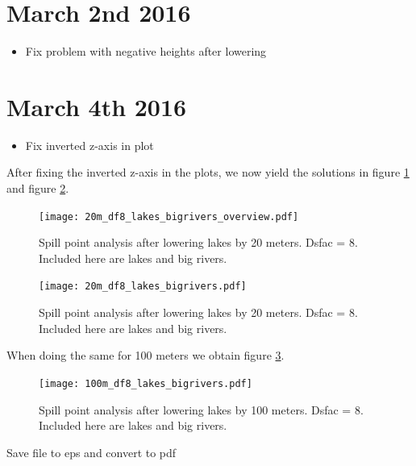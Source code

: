 \documentclass[10pt,a4paper]{article}
\begin{document}
\section{March 2nd 2016}
\begin{itemize}
\item Fix problem with negative heights after lowering
\end{itemize}


\section{March 4th 2016}
\begin{itemize}
\item Fix inverted z-axis in plot
\end{itemize}

After fixing the inverted z-axis in the plots, we now yield the solutions in figure \ref{fig:trap_analysis_overview_20m_df8} and figure \ref{fig:trap_analysis_traps_20m_df8}.

\begin{figure}[H]
  \centering
    \texttt{[image: 20m\_df8\_lakes\_bigrivers\_overview.pdf]}
  \caption{Spill point analysis after lowering lakes by 20 meters. Dsfac = 8. Included here are lakes and big rivers.}
  \label{fig:trap_analysis_overview_20m_df8}
\end{figure}

\begin{figure}[H]
  \centering
    \texttt{[image: 20m\_df8\_lakes\_bigrivers.pdf]}
  \caption{Spill point analysis after lowering lakes by 20 meters. Dsfac = 8. Included here are lakes and big rivers.}
  \label{fig:trap_analysis_traps_20m_df8}
\end{figure}

When doing the same for 100 meters we obtain figure \ref{fig:trap_analysis_traps_100m_df8}.

\begin{figure}[H]
  \centering
    \texttt{[image: 100m\_df8\_lakes\_bigrivers.pdf]}
  \caption{Spill point analysis after lowering lakes by 100 meters. Dsfac = 8. Included here are lakes and big rivers.}
  \label{fig:trap_analysis_traps_100m_df8}
\end{figure}

Save file to eps and convert to pdf
\end{document}
